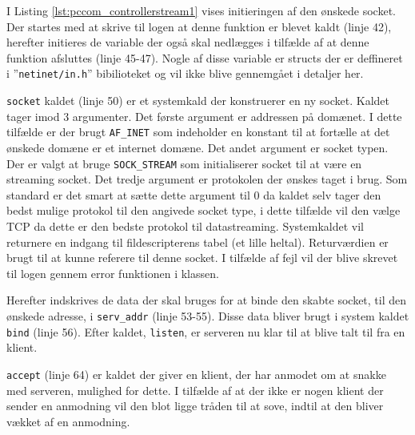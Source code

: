 I Listing \ref{lst:pccom_controllerstream1} vises initieringen af den ønskede socket. Der startes med at skrive til logen at denne funktion er blevet kaldt (linje 42), herefter initieres de variable der også skal nedlægges i tilfælde af at denne funktion afsluttes (linje 45-47). Nogle af disse variable er structs der er deffineret i ''\texttt{netinet/in.h}'' bibilioteket og vil ikke blive gennemgået i detaljer her.



\texttt{socket} kaldet (linje 50) er et systemkald der konstruerer en ny socket. Kaldet tager imod 3 argumenter. Det første argument er addressen på domænet. I dette tilfælde er der brugt \texttt{AF\_INET} som indeholder en konstant til at fortælle at det ønskede domæne er et internet domæne. Det andet argument er socket typen. Der er valgt at bruge \texttt{SOCK\_STREAM} som initialiserer socket til at være en streaming socket. Det tredje argument er protokolen der ønskes taget i brug. Som standard er det smart at sætte dette argument til 0 da kaldet selv tager den bedst mulige protokol til den angivede socket type, i dette tilfælde vil den vælge TCP da dette er den bedste protokol til datastreaming. Systemkaldet vil returnere en indgang til fildescripterens tabel (et lille heltal). Returværdien er brugt til at kunne referere til denne socket. I tilfælde af fejl vil der blive skrevet til logen gennem error funktionen i klassen.

Herefter indskrives de data der skal bruges for at binde den skabte socket, til den ønskede adresse, i \texttt{serv\_addr} (linje 53-55). Disse data bliver brugt i system kaldet \texttt{bind} (linje 56). Efter kaldet, \texttt{listen}, er serveren nu klar til at blive talt til fra en klient.

\texttt{accept} (linje 64) er kaldet der giver en klient, der har anmodet om at snakke med serveren, mulighed for dette. I tilfælde af at der ikke er nogen klient der sender en anmodning vil den blot ligge tråden til at sove, indtil at den bliver vækket af en anmodning.



